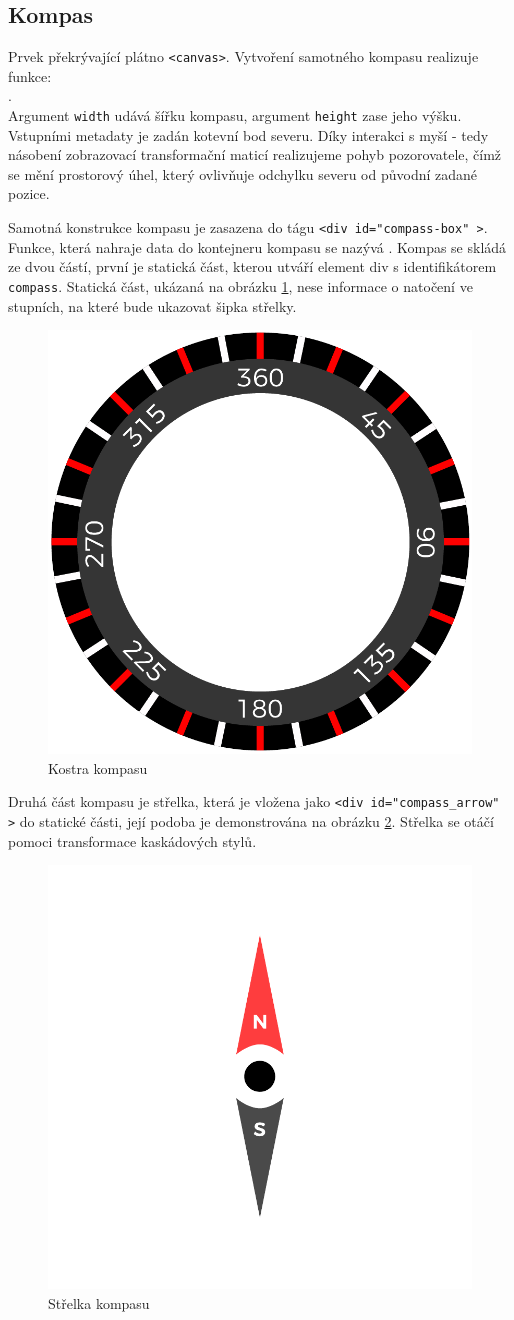 \subsection{Kompas}
Prvek překrývající plátno \texttt{<canvas>}. Vytvoření samotného kompasu realizuje funkce: \\\texttt{\createCompassFull}.\\ Argument \texttt{width} udává šířku kompasu, argument \texttt{height} zase jeho výšku. Vstupními metadaty je zadán kotevní bod severu. Díky interakci s myší - tedy násobení zobrazovací transformační maticí realizujeme pohyb pozorovatele, čímž se mění prostorový úhel, který ovlivňuje odchylku severu  od původní zadané pozice.

Samotná konstrukce kompasu je zasazena do tágu \texttt{<div id="compass-box"\,>}. Funkce, která nahraje data do kontejneru kompasu se nazývá \texttt{\createCompass}. Kompas se skládá ze dvou částí, první je statická část, kterou utváří element div s identifikátorem \texttt{compass}. Statická část, ukázaná  na obrázku \ref{img:kompas_kostra}, nese informace o natočení ve stupních, na které bude ukazovat šipka střelky. 


\begin{figure}[h]
	\label{img:kompas_kostra}
	\centering
	\includegraphics[scale=1.0,angle=0,width=0.37\linewidth]{obrazky-figures/kompas_kostra}
	\caption{Kostra kompasu}
\end{figure}

 

Druhá část kompasu je střelka, která je vložena jako \texttt{<div id="compass\_arrow"\,>} do statické části, její podoba je demonstrována na obrázku \ref{img:kompas_strelka}. Střelka se  otáčí pomoci transformace kaskádových stylů.

\begin{figure}[h]
	\label{img:kompas_strelka}
	\centering
	\includegraphics[scale=1.0,angle=0,width=0.4\linewidth]{obrazky-figures/kompas_strelka}
	\caption{Střelka kompasu}
\end{figure}




